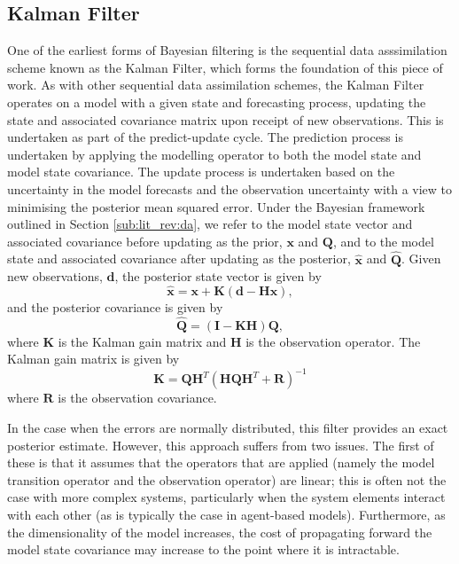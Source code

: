 \subsection{Kalman Filter}\label{sub:method:kf}

One of the earliest forms of Bayesian filtering is the sequential data
asssimilation scheme known as the Kalman Filter, which forms the foundation of
this piece of work.
As with other sequential data assimilation schemes, the Kalman Filter operates
on a model with a given state and forecasting process, updating the state and
associated covariance matrix upon receipt of new observations.
This is undertaken as part of the predict-update cycle.
The prediction process is undertaken by applying the modelling operator to both
the model state and model state covariance.
The update process is undertaken based on the uncertainty in the model forecasts
and the observation uncertainty with a view to minimising the posterior mean
squared error.
Under the Bayesian framework outlined in Section \ref{sub:lit_rev:da}, we refer
to the model state vector and associated covariance before updating as the prior,
$\mathbf{x}$ and $\mathbf{Q}$, and to the model state and associated covariance
after updating as the posterior, $\hat{\mathbf{x}}$ and $\hat{\mathbf{Q}}$.
Given new observations, $\mathbf{d}$, the posterior state vector is given by
\begin{equation}
    \hat{\mathbf{x}} = \mathbf{x} + \mathbf{K} \left(
                        \mathbf{d} - \mathbf{H} \mathbf{x} \right),
\end{equation}
and the posterior covariance is given by
\begin{equation}
    \hat{\mathbf{Q}} = \left( \mathbf{I} - \mathbf{K} \mathbf{H} \right)
                        \mathbf{Q},
\end{equation}
where $\mathbf{K}$ is the Kalman gain matrix and $\mathbf{H}$ is the observation operator.
The Kalman gain matrix is given by
\begin{equation}
    \mathbf{K} = \mathbf{Q} \mathbf{H}^T \left(
                    \mathbf{H} \mathbf{Q} \mathbf{H}^T + \mathbf{R}
                 \right) ^ {-1}
\end{equation}
where $\mathbf{R}$ is the observation covariance.

In the case when the errors are normally distributed, this filter provides an
exact posterior estimate.
However, this approach suffers from two issues.
The first of these is that it assumes that the operators that are applied
(namely the model transition operator and the observation operator) are linear;
this is often not the case with more complex systems, particularly when the
system elements interact with each other (as is typically the case in
agent-based models).
Furthermore, as the dimensionality of the model increases, the cost of
propagating forward the model state covariance may increase to the point where
it is intractable.

